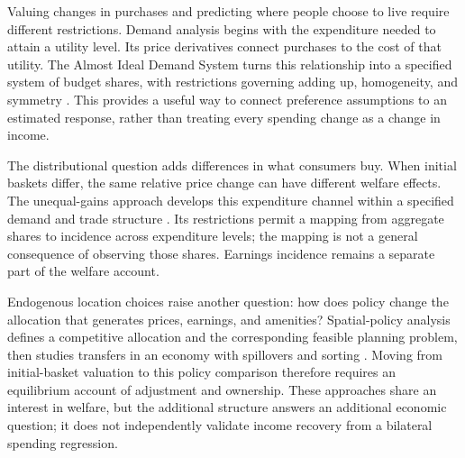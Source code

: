 Valuing changes in purchases and predicting where people choose to live require
different restrictions. Demand analysis begins with the expenditure needed to
attain a utility level. Its price derivatives connect purchases to the cost of
that utility. The Almost Ideal Demand System turns this relationship into a
specified system of budget shares, with restrictions governing adding up,
homogeneity, and symmetry \cite{deaton_muellbauer_1980}. This provides a useful
way to connect preference assumptions to an estimated response, rather than
treating every spending change as a change in income.

The distributional question adds differences in what consumers buy. When initial
baskets differ, the same relative price change can have different welfare effects.
The unequal-gains approach develops this expenditure channel within a specified
demand and trade structure \cite{fajgelbaum_khandelwal_2016}. Its restrictions
permit a mapping from aggregate shares to incidence across expenditure levels;
the mapping is not a general consequence of observing those shares. Earnings
incidence remains a separate part of the welfare account.

Endogenous location choices raise another question: how does policy change the
allocation that generates prices, earnings, and amenities? Spatial-policy analysis
defines a competitive allocation and the corresponding feasible planning problem,
then studies transfers in an economy with spillovers and sorting
\cite{fajgelbaum_gaubert_2020}. Moving from initial-basket valuation to this
policy comparison therefore requires an equilibrium account of adjustment and
ownership. These approaches share an interest in welfare, but the additional
structure answers an additional economic question; it does not independently
validate income recovery from a bilateral spending regression.
